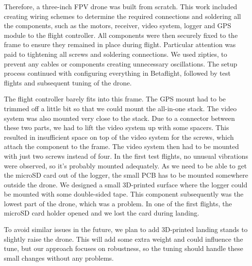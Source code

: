 \documentclass[a4paper,11pt]{scrartcl}
\begin{document}
Therefore, a three-inch FPV drone was built from scratch. This work included creating wiring schemes to determine the required connections and soldering all the components, such as the motors, receiver, video system, logger and GPS module to the flight controller. All components were then securely fixed to the frame to ensure they remained in place during flight. Particular attention was paid to tightening all screws and soldering connections. We used zipties, to prevent any cables or components creating unnecessary oscillations. The setup process continued with configuring everything in Betaflight, followed by test flights and subsequent tuning of the drone.

The flight controller barely fits into this frame. The GPS mount had to be trimmed off a little bit so that we could mount the all-in-one stack. The video system was also mounted very close to the stack. Due to a connector between these two parts, we had to lift the video system up with some spacers. This resulted in insufficient space on top of the video system for the screws, which attach the component to the frame. The video system then had to be mounted with just two screws instead of four. In the first test flights, no unusual vibrations were observed, so it's probably mounted adequately. As we need to be able to get the microSD card out of the logger, the small PCB has to be mounted somewhere outside the drone. We designed a small 3D-printed surface where the logger could be mounted with some double-sided tape. This component subsequently was the lowest part of the drone, which was a problem. In one of the first flights, the microSD card holder opened and we lost the card during landing.

To avoid similar issues in the future, we plan to add 3D-printed landing stands to slightly raise the drone. This will add some extra weight and could influence the tune, but our approach focuses on robustness, so the tuning should handle these small changes without any problems.
\end{document}
